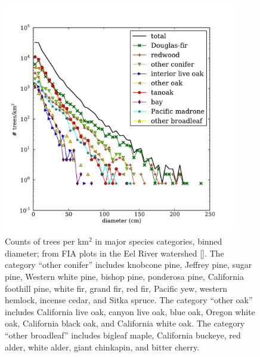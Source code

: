 \begin{figure}[here]
\includegraphics[width=0.9\textwidth]{ch1-sapflow/figures/Figure02.pdf}
\caption{Counts of trees per km$^2$ in major species categories, binned diameter; from FIA plots in the Eel River watershed [\cite{woudenberg2010forest}].  The category ``other conifer'' includes knobcone pine, Jeffrey pine, sugar pine, Western white pine, bishop pine, ponderosa pine, California foothill pine, white fir, grand fir, red fir, Pacific yew, western hemlock, incense cedar, and Sitka spruce.  The category ``other oak'' includes California live oak, canyon live oak, blue oak, Oregon white oak, California black oak, and California white oak.  The category ``other broadleaf'' includes bigleaf maple, California buckeye, red alder, white alder, giant chinkapin, and bitter cherry.}
\label{fig:sapflow_abundances}
\end{figure}

